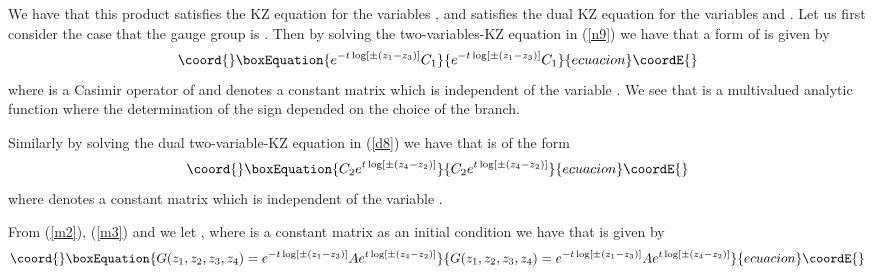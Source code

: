 \documentclass[a4paper,a4paper]{article}
\begin{document}
We have that this product \coordHE{} satisfies the KZ equation for the
variables \coordHE{}, \coordHE{} and satisfies the dual KZ equation
for the variables \coordHE{} and \coordHE{}.
Let us first consider the case that the gauge group is \coordHE{}.
Then by solving the two-variables-KZ equation in (\ref{n9}) we have that a form of \coordHE{} is 
given by \cite{Chari}\cite{Koh}\cite{Dri}
\begin{equation}\coord{}\boxEquation{
e^{-t\log [\pm (z_1-z_3)]}C_1
\label{m2}
}{
e^{-t\log [\pm (z_1-z_3)]}C_1
}{ecuacion}\coordE{}\end{equation}
where \coordHE{} is a Casimir operator of \coordHE{} and \coordHE{} denotes a constant matrix which is independent
of the variable \coordHE{}.
We see that \coordHE{} is a multivalued analytic function
where the determination of the \myHighlight{$\pm$}\coordHE{} sign depended on the choice of the
branch.

Similarly by solving the dual two-variable-KZ equation
 in (\ref{d8}) we have that
\coordHE{} is of the form
\begin{equation}\coord{}\boxEquation{
C_2e^{t\log [\pm (z_4-z_2)]}
\label{m3}
}{
C_2e^{t\log [\pm (z_4-z_2)]}
}{ecuacion}\coordE{}\end{equation}
where \coordHE{} denotes a constant matrix which is independent
of the variable \coordHE{}.

From (\ref{m2}), (\ref{m3}) and we let
\coordHE{}, 
\coordHE{} where \coordHE{} is a constant matrix as an initial condition we have that \coordHE{} is given by
\begin{equation}\coord{}\boxEquation{
G(z_1, z_2, z_3, z_4)=
e^{-t\log [\pm (z_1-z_3)]}Ae^{t\log [\pm (z_4-z_2)]}
\label{m4}
}{
G(z_1, z_2, z_3, z_4)=
e^{-t\log [\pm (z_1-z_3)]}Ae^{t\log [\pm (z_4-z_2)]}
}{ecuacion}\coordE{}\end{equation}

 
\end{document}
